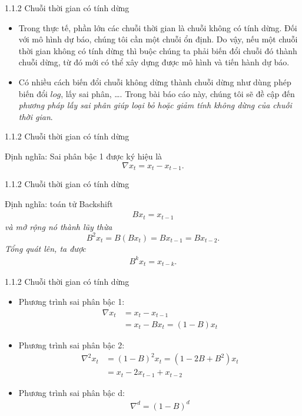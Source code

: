 \documentclass[notheorems,envcountsect,hyperref=unicode]{beamer}
\begin{document}
\begin{frame}{1.1.2 Chuỗi thời gian có tính dừng}
\begin{itemize}
\item Trong thực tế, phần lớn các chuỗi thời gian là chuỗi không có tính dừng. Đối với mô hình dự báo, chúng tôi cần một chuỗi ổn định. Do vậy, nếu một chuỗi thời gian không có tính dừng thì buộc chúng ta phải biến đổi chuỗi đó thành chuỗi dừng, từ đó mới có thể xây dựng được mô hình và tiến hành dự báo.
\pause
\item Có nhiều cách biến đổi chuỗi không dừng thành chuỗi dừng như dùng phép biến đổi $log$, lấy sai phân, \dots. Trong bài báo cáo này, chúng tôi sẽ đề cập đến \textit{phương pháp lấy sai phân giúp loại bỏ hoặc giảm tính không dừng của chuỗi thời gian}.
\end{itemize}
\end{frame}

\begin{frame}{1.1.2 Chuỗi thời gian có tính dừng}
	\begin{block}{Định nghĩa: \cite{1}}
Sai phân bậc 1 được ký hiệu là
\begin{equation}
\nabla x_{t}=x_{t}-x_{t-1}. \label{ct1.66}
\end{equation}
	\end{block}
\end{frame}

\begin{frame}{1.1.2 Chuỗi thời gian có tính dừng}
	\begin{block}{Định nghĩa: toán tử Backshift \cite{1}}
	\textit{\begin{align*}
			Bx_{t}=x_{t-1} 
			\end{align*}
			và mở rộng nó thành lũy thừa $$B^{2}x_{t}=B(Bx_{t})=Bx_{t-1}=Bx_{t-2}.$$ Tổng quát lên, ta được
			\begin{align*}
			B^{k}x_{t}=x_{t-k}.
			\end{align*}}
	\end{block}
\end{frame}

\begin{frame}{1.1.2 Chuỗi thời gian có tính dừng}
\begin{itemize}
	\item Phương trình sai phân bậc 1:
	\begin{align*}
	\nabla x_{t}&=x_{t}-x_{t-1}\\
	&=x_t -Bx_t=(1-B)x_{t}
	\end{align*}
	\item Phương trình sai phân bậc 2:
	\begin{align*}
	\nabla^{2} x_{t} &=(1-B)^{2}x_{t}=(1-2B+B^{2})x_{t}\\
	&=x_{t}-2x_{t-1}+x_{t-2}
	\end{align*}
	\item Phương trình sai phân bậc d:
	\begin{align*}
	\nabla^{d}=(1-B)^{d}
	\end{align*}
\end{itemize}
\end{frame}
\end{document}
